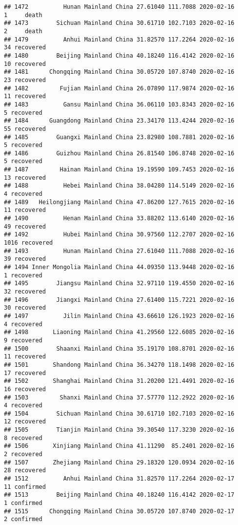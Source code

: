 \documentclass[
]{article}
\begin{document}
\begin{verbatim}
## 1472          Hunan Mainland China 27.61040 111.7088 2020-02-16     1     death
## 1473        Sichuan Mainland China 30.61710 102.7103 2020-02-16     2     death
## 1479          Anhui Mainland China 31.82570 117.2264 2020-02-16    34 recovered
## 1480        Beijing Mainland China 40.18240 116.4142 2020-02-16    10 recovered
## 1481      Chongqing Mainland China 30.05720 107.8740 2020-02-16    23 recovered
## 1482         Fujian Mainland China 26.07890 117.9874 2020-02-16    11 recovered
## 1483          Gansu Mainland China 36.06110 103.8343 2020-02-16     5 recovered
## 1484      Guangdong Mainland China 23.34170 113.4244 2020-02-16    55 recovered
## 1485        Guangxi Mainland China 23.82980 108.7881 2020-02-16     5 recovered
## 1486        Guizhou Mainland China 26.81540 106.8748 2020-02-16     5 recovered
## 1487         Hainan Mainland China 19.19590 109.7453 2020-02-16    13 recovered
## 1488          Hebei Mainland China 38.04280 114.5149 2020-02-16     4 recovered
## 1489   Heilongjiang Mainland China 47.86200 127.7615 2020-02-16    11 recovered
## 1490          Henan Mainland China 33.88202 113.6140 2020-02-16    49 recovered
## 1492          Hubei Mainland China 30.97560 112.2707 2020-02-16  1016 recovered
## 1493          Hunan Mainland China 27.61040 111.7088 2020-02-16    39 recovered
## 1494 Inner Mongolia Mainland China 44.09350 113.9448 2020-02-16     1 recovered
## 1495        Jiangsu Mainland China 32.97110 119.4550 2020-02-16    32 recovered
## 1496        Jiangxi Mainland China 27.61400 115.7221 2020-02-16    30 recovered
## 1497          Jilin Mainland China 43.66610 126.1923 2020-02-16     4 recovered
## 1498       Liaoning Mainland China 41.29560 122.6085 2020-02-16     9 recovered
## 1500        Shaanxi Mainland China 35.19170 108.8701 2020-02-16    11 recovered
## 1501       Shandong Mainland China 36.34270 118.1498 2020-02-16    17 recovered
## 1502       Shanghai Mainland China 31.20200 121.4491 2020-02-16    16 recovered
## 1503         Shanxi Mainland China 37.57770 112.2922 2020-02-16     4 recovered
## 1504        Sichuan Mainland China 30.61710 102.7103 2020-02-16    12 recovered
## 1505        Tianjin Mainland China 39.30540 117.3230 2020-02-16     8 recovered
## 1506       Xinjiang Mainland China 41.11290  85.2401 2020-02-16     2 recovered
## 1507       Zhejiang Mainland China 29.18320 120.0934 2020-02-16    28 recovered
## 1512          Anhui Mainland China 31.82570 117.2264 2020-02-17    11 confirmed
## 1513        Beijing Mainland China 40.18240 116.4142 2020-02-17     1 confirmed
## 1515      Chongqing Mainland China 30.05720 107.8740 2020-02-17     2 confirmed

\end{verbatim}
\end{document}
